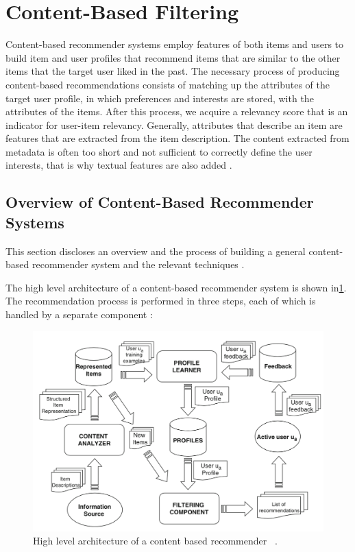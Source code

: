 
\section{Content-Based Filtering}\label{section:content_based_filtering}

Content-based recommender systems employ features of both items and users to build item and user profiles that recommend items that are similar to the other items that the target user liked in the past. The necessary process of producing content-based recommendations consists of matching up the attributes of the target user profile, in which preferences and interests are stored, with the attributes of the items. After this process, we acquire a relevancy score that is an indicator for user-item relevancy. Generally, attributes that describe an item are features that are extracted from the item description. The content extracted from metadata is often too short and not sufficient to correctly define the user interests, that is why textual features are also added \cite{de2015semantics}.

\subsection{Overview of Content-Based Recommender Systems}

This section discloses an overview and the process of building a general content-based recommender system and the relevant techniques \cite{de2015semantics}.

The high level architecture of a content-based recommender system is shown in\ref{fig:high-level-content-based}. The recommendation process is performed in three steps, each of which is handled by a separate component \cite{de2015semantics}:

\begin{figure}[htp]
	\centering
	\includegraphics[width=\textwidth]{figures/HighLevelContentBased.png}
	\caption{High level architecture of a content based recommender  ~\parencite{de2015semantics}.}
	\label{fig:high-level-content-based}
\end{figure}



